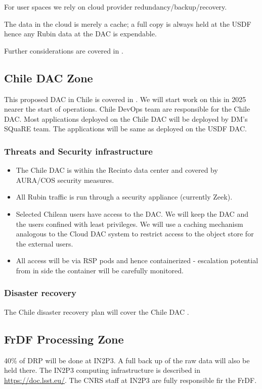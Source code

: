 For user  spaces we rely on \gls{cloud} provider redundancy/backup/recovery.

The data in the cloud is merely a cache; a full copy is always held at the \gls{USDF} hence any Rubin data at the \gls{DAC} is expendable.

Further considerations are covered in .


\subsection{ Chile \gls{DAC} Zone}
This proposed \gls{DAC} in Chile is covered in \cite{LDM-572}.
We will  start work on this in 2025 nearer the start of operations.
Chile DevOps team are responsible for the Chile \gls{DAC}.
Most applications deployed on the Chile DAC will be deployed by DM's \gls{SQuaRE} team.
The applications will be same as deployed on the USDF \gls{DAC}.

\subsubsection{ Threats and Security infrastructure}

\begin{itemize}
\item The Chile DAC is within the Recinto data center and covered by \gls{AURA}/COS security measures.\item All Rubin traffic is run through a security appliance (currently Zeek).
\item Selected Chilean users have access to the \gls{DAC}. We will keep the \gls{DAC} and the users confined with least privileges. We will use a caching mechanism analogous to the Cloud \gls{DAC} system to restrict access to the object store for the external users.
\item All access will be via \gls{RSP} pods and hence containerized - escalation potential from in side the container will be carefully monitored.
\end{itemize}
\subsubsection{Disaster recovery}
The Chile disaster recovery plan will cover the Chile \gls{DAC} .



\subsection{FrDF Processing Zone}
40\% of \gls{DRP} will be done at \gls{IN2P3}.
A full back up of the raw data will also be held there.
The \gls{IN2P3} computing infrastructure is described in \url{https://doc.lsst.eu/}.
The \gls{CNRS} staff at \gls{IN2P3} are fully responsible fir the \gls{FrDF}.

